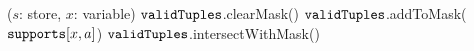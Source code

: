 \PROCEDURE \UpdateTable($s$: store, $x$: variable) \label{line:updateTable:1} 
        \STATE $\texttt{validTuples}$.clearMask() \label{line:updateTable:4} 
         \label{line:updateTable:5} 
          \STATE $\texttt{validTuples}$.addToMask($\texttt{supports}[x,a]$) \label{line:updateTable:6} 
        \ENDFOREACH      
        \STATE $\texttt{validTuples}$.intersectWithMask() \label{line:updateTable:7} 

